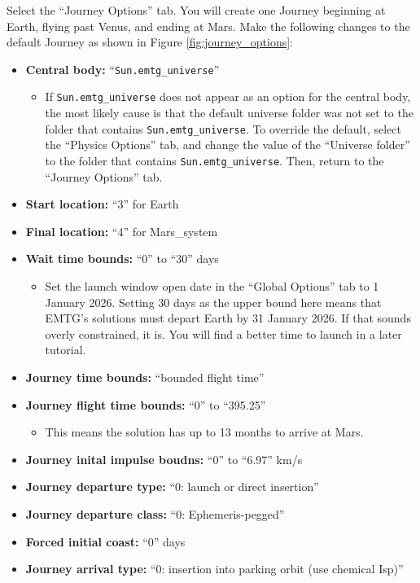\documentclass[11pt]{article}
\begin{document}
Select the ``Journey Options'' tab. You will create one Journey beginning at Earth, flying past Venus, and ending at Mars. Make the following changes to the default Journey as shown in Figure \ref{fig:journey_options}:

\begin{itemize}
	\item \textbf{Central body:} ``\texttt{Sun.emtg\_universe}''
	\begin{itemize}
		\item If \texttt{Sun.emtg\_universe} does not appear as an option for the central body, the most likely cause is that the default universe folder was not set to the folder that contains \texttt{Sun.emtg\_universe}. To override the default, select the ``Physics Options'' tab, and change the value of the ``Universe folder'' to the folder that contains \texttt{Sun.emtg\_universe}. Then, return to the ``Journey Options'' tab.
	\end{itemize}
	\item \textbf{Start location:} ``3'' for Earth
	\item \textbf{Final location:} ``4'' for Mars\_system
	\item \textbf{Wait time bounds:} ``0'' to ``30'' days
	\begin{itemize}
		\item Set the launch window open date in the ``Global Options'' tab to 1 January 2026. Setting 30 days as the upper bound here means that \ac{EMTG}’s solutions must depart Earth by 31 January 2026. If that sounds overly constrained, it is. You will find a better time to launch in a later tutorial.
	\end{itemize}
	\item \textbf{Journey time bounds:} ``bounded flight time''
	\item \textbf{Journey flight time bounds:} ``0'' to ``395.25''
	\begin{itemize}
		\item This means the solution has up to 13 months to arrive at Mars.
	\end{itemize}
	\item \textbf{Journey inital impulse boudns:} ``0'' to ``6.97'' km/s
	\item \textbf{Journey departure type:} ``0: launch or direct insertion''
	\item \textbf{Journey departure class:} ``0: Ephemeris-pegged''
	\item \textbf{Forced initial coast:} ``0'' days
	\item \textbf{Journey arrival type:} ``0: insertion into parking orbit (use chemical Isp)''

\end{itemize}
\end{document}
